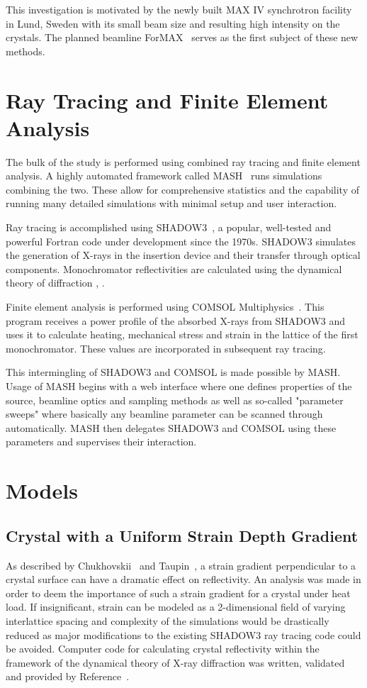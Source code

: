 \documentclass[preprint]{iucr}              %
\begin{document}
This investigation is motivated by the newly built MAX IV synchrotron facility in Lund, Sweden with its small beam size and resulting high intensity on the crystals. The planned beamline ForMAX~\cite{formax} serves as the first subject of these new methods.

\section{Ray Tracing and Finite Element Analysis}

The bulk of the study is performed using combined ray tracing and finite element analysis. A highly automated framework called MASH~\cite{mash} runs simulations combining the two. These allow for comprehensive statistics and the capability of running many detailed simulations with minimal setup and user interaction.

Ray tracing is accomplished using SHADOW3~\cite{shadow3}, a popular, well-tested and powerful Fortran code under development since the 1970s. SHADOW3 simulates the generation of X-rays in the insertion device and their transfer through optical components. Monochromator reflectivities are calculated using the dynamical theory of diffraction \cite{dynamicaltheory}, \cite{asymmetricdiffraction}.

Finite element analysis is performed using COMSOL Multiphysics~\cite{comsol}. This program receives a power profile of the absorbed X-rays from SHADOW3 and uses it to calculate heating, mechanical stress and strain in the lattice of the first monochromator. These values are incorporated in subsequent ray tracing.

This intermingling of SHADOW3 and COMSOL is made possible by MASH. Usage of MASH begins with a web interface where one defines properties of the source, beamline optics and sampling methods as well as so-called "parameter sweeps" where basically any beamline parameter can be scanned through automatically. MASH then delegates SHADOW3 and COMSOL using these parameters and supervises their interaction.

\section{Models}

\subsection{Crystal with a Uniform Strain Depth Gradient}\label{strain_gradient} 
As described by Chukhovskii~\cite{Chukhovskii} and Taupin~\cite{Taupin}, a strain gradient perpendicular to a crystal surface can have a dramatic effect on reflectivity. An analysis was made in order to deem the importance of such a strain gradient for a crystal under heat load. If insignificant, strain can be modeled as a 2-dimensional field of varying interlattice spacing and complexity of the simulations would be drastically reduced as major modifications to the existing SHADOW3 ray tracing code could be avoided. Computer code for calculating crystal reflectivity within the framework of the dynamical theory of X-ray diffraction was written, validated and provided by Reference~\cite{coins}.
\end{document}
